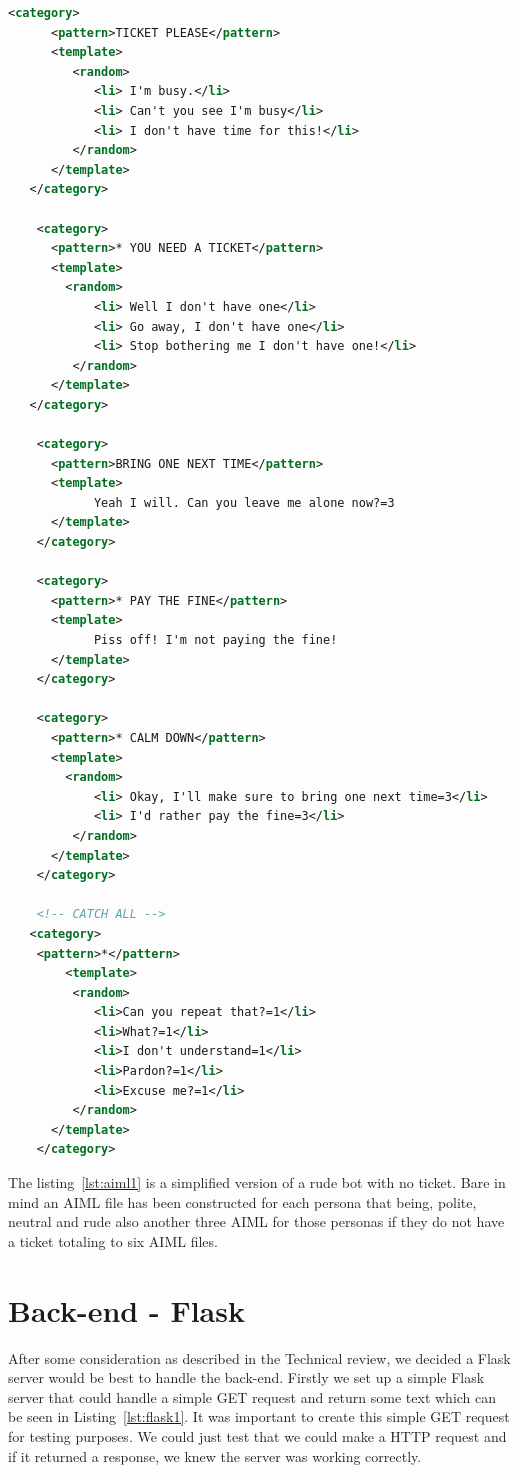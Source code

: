 \begin{lstlisting}[caption={Generate AIML response},label={lst:aiml1},language=XML]
    <category>
      <pattern>TICKET PLEASE</pattern>
      <template>
         <random>
            <li> I'm busy.</li>
            <li> Can't you see I'm busy</li>
            <li> I don't have time for this!</li>
         </random>
      </template>
   </category>
   
    <category>
      <pattern>* YOU NEED A TICKET</pattern>
      <template>
        <random>
            <li> Well I don't have one</li>
            <li> Go away, I don't have one</li>
            <li> Stop bothering me I don't have one!</li>
         </random>
      </template>
   </category>
   
    <category>
      <pattern>BRING ONE NEXT TIME</pattern>
      <template>
            Yeah I will. Can you leave me alone now?=3
      </template>
    </category>
    
    <category>
      <pattern>* PAY THE FINE</pattern>
      <template>
            Piss off! I'm not paying the fine!
      </template>
    </category>

    <category>
      <pattern>* CALM DOWN</pattern>
      <template>
        <random>
            <li> Okay, I'll make sure to bring one next time=3</li>
            <li> I'd rather pay the fine=3</li>
         </random>
      </template>
    </category>
    
    <!-- CATCH ALL -->
   <category>
    <pattern>*</pattern>
        <template>
         <random>
            <li>Can you repeat that?=1</li>
            <li>What?=1</li>
            <li>I don't understand=1</li>
            <li>Pardon?=1</li>
            <li>Excuse me?=1</li>
         </random>
      </template>
    </category>
\end{lstlisting}

The listing~\ref{lst:aiml1} is a simplified version of a rude bot with no ticket. Bare in mind an AIML file has been constructed for each persona that being, polite, neutral and rude also another three AIML for those personas if they do not have a ticket totaling to six AIML files.



\section{Back-end - Flask}
After some consideration as described in the Technical review, we decided a Flask server would be best to handle the back-end. Firstly we set up a simple Flask server that could handle a simple GET request and return some text which can be seen in Listing~\ref{lst:flask1}. It was important to create this simple GET request for testing purposes. We could just test that we could make a HTTP request and if it returned a response, we knew the server was working correctly.\newline


